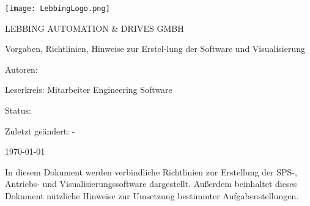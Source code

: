 \begin{titlepage}

    
    \begin{center} 
    \texttt{[image: LebbingLogo.png]}
    \par\vspace{1.5cm}
    {\scshape\Large LEBBING AUTOMATION \& DRIVES GMBH\par}
    \vspace{2cm}
    
    {\Huge\textbf{\titlename}\par}
    \vspace{0.5cm}
    {\Large Vorgaben, Richtlinien, Hinweise zur Erstel-lung der Software und Visualisierung\par}
    \vspace{1.5cm}
\end{center}
    
        {Autoren:   \authorname~\par}
        {Leserkreis:  Mitarbeiter Engineering Software \par}
        {Status:   \state~\par}
        {Zuletzt geändert:   \lasteditor - \lebbing \par}
        {\today~\par}        

        \vspace{3cm}
        \noindent In diesem Dokument werden verbindliche Richtlinien zur Erstellung der SPS-, Antriebs- und Visualisierungssoftware dargestellt. Außerdem beinhaltet dieses Dokument nützliche Hinweise zur Umsetzung bestimmter Aufgabenstellungen.
    
    \end{titlepage}